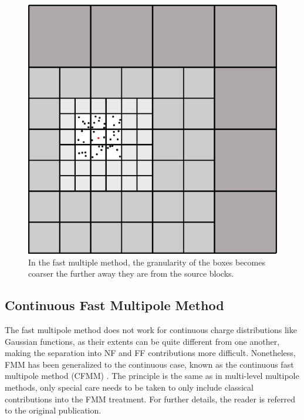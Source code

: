 \begin{figure}
\centering
\includegraphics[scale=0.35]{Pics/FMM2}
\caption[Fast multipole method]{In the fast multiple method, the granularity of the boxes becomes coarser the further away they are from the source blocks.}
\label{fig:FMM2}
\end{figure}


\subsection{Continuous Fast Multipole Method}

The fast multipole method does not work for continuous charge distributions like Gaussian functions, as their extents can be quite different from one another, making the separation into NF and FF contributions more difficult. Nonetheless, FMM has been generalized to the continuous case, known as the continuous fast multipole method (CFMM) \cite{Whi1996}. The principle is the same as in multi-level multipole methods, only special care needs to be taken to only include classical contributions into the FMM treatment. For further details, the reader is referred to the original publication. 


